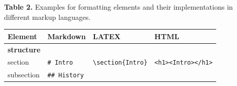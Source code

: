 \documentclass[10pt,fleqn]{wlpeerj}
\begin{document}
\textbf{Table 2.} Examples for formatting elements and their
implementations in different markup languages.

\begin{longtable}[c]{@{}llll@{}}
\toprule
\begin{minipage}[b]{0.11\columnwidth}\raggedright\strut
\textbf{Element}
\strut\end{minipage} &
\begin{minipage}[b]{0.17\columnwidth}\raggedright\strut
\textbf{Markdown}
\strut\end{minipage} &
\begin{minipage}[b]{0.33\columnwidth}\raggedright\strut
\textbf{LATEX}
\strut\end{minipage} &
\begin{minipage}[b]{0.27\columnwidth}\raggedright\strut
\textbf{HTML}
\strut\end{minipage}\tabularnewline
\midrule
\endhead
\begin{minipage}[t]{0.11\columnwidth}\raggedright\strut
\textbf{structure}
\strut\end{minipage} &
\begin{minipage}[t]{0.17\columnwidth}\raggedright\strut
\strut\end{minipage} &
\begin{minipage}[t]{0.33\columnwidth}\raggedright\strut
\strut\end{minipage}\tabularnewline
\begin{minipage}[t]{0.11\columnwidth}\raggedright\strut
section
\strut\end{minipage} &
\begin{minipage}[t]{0.17\columnwidth}\raggedright\strut
\texttt{\#\ Intro}
\strut\end{minipage} &
\begin{minipage}[t]{0.33\columnwidth}\raggedright\strut
\texttt{\textbackslash{}section\{Intro\}}
\strut\end{minipage} &
\begin{minipage}[t]{0.27\columnwidth}\raggedright\strut
\texttt{\textless{}h1\textgreater{}\textless{}Intro\textgreater{}\textless{}/h1\textgreater{}}
\strut\end{minipage}\tabularnewline
\begin{minipage}[t]{0.11\columnwidth}\raggedright\strut
subsection
\strut\end{minipage} &
\begin{minipage}[t]{0.17\columnwidth}\raggedright\strut
\texttt{\#\#\ History}
\strut\end{minipage} &

\end{longtable}
\end{document}
